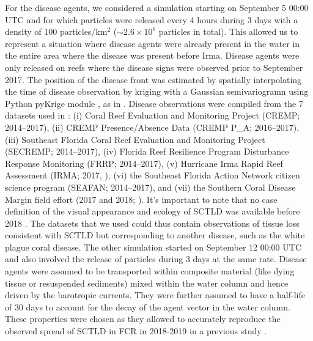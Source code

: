 \documentclass[fleqn,10pt]{wlscirep}
\newcommand{\modif}[1]{{#1}}
\begin{document}
For the disease agents, we considered a simulation starting on September 5 00:00 UTC and for which particles were released every 4 hours during 3 days with a density of 100 particles/km$^2$ ($\sim2.6\times 10^{6}$ particles in total). This allowed us to represent a situation where disease agents were already present in the water in the entire area where the disease was present before Irma. Disease agents were only released on reefs where the disease signs were observed prior to September 2017. The position of the disease front was estimated by spatially interpolating the time of disease observation by kriging with a Gaussian semivariogramn using Python pyKrige module \citep{murphy2014pykrige}, as in \cite{DobbySCTLD}. Disease observations were compiled from the 7 datasets used in \cite{muller2020spatial}: (i) Coral Reef Evaluation and Monitoring Project (CREMP; 2014–2017), (ii) CREMP Presence/Absence Data (CREMP P\_A; 2016–2017), (iii) Southeast Florida Coral Reef Evaluation and Monitoring Project (SECREMP; 2014–2017), (iv) Florida Reef Resilience Program Disturbance Response Monitoring (FRRP; 2014–2017), (v) Hurricane Irma Rapid Reef Assessment (IRMA; 2017, \cite{viehman2018}), (vi) the Southeast Florida Action Network citizen science program (SEAFAN; 2014–2017), and (vii) the \modif{Southern} Coral Disease Margin field effort (2017 and 2018; \cite{neely2018surveying}). It's important to note that no case definition of the visual appearance and ecology of SCTLD was available before 2018 \citep{noaa2018}. The datasets that we used could thus contain observations of tissue loss consistent with SCTLD but corresponding to another disease, such as the white plague coral disease. The other simulation started on September 12 00:00 UTC and also involved the release of particles during 3 days at the same rate. Disease agents were assumed to be transported within composite material (like dying tissue or resuspended sediments) mixed within the water column and hence driven by the barotropic currents. They were further assumed to have a half-life of 30 days \modif{to account for the decay of the agent vector in the water column. These properties were chosen as they allowed to accurately reproduce the observed spread of SCTLD in FCR in 2018-2019 in a previous study} \citep{DobbySCTLD}.
\end{document}
